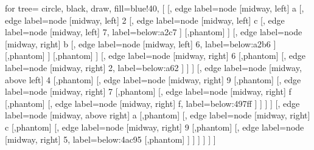\documentclass[10pt,a4paper,leqno,bibliography=totoc]{scrartcl}
\newenvironment{alphafootnotes}
{\par\edef\savedfootnotenumber{\number\value{footnote}}
\renewcommand{\thefootnote}{\alph{footnote}}
\setcounter{footnote}{0}}
{\par\setcounter{footnote}{\savedfootnotenumber}}
\begin{document}
\begin{alphafootnotes}
\begin{multicols*}{2}
		
		\begin{forest}
		for tree={
			circle,
			black,
			draw,
			fill=blue!40,
		}
		[{}
		[{}, edge label={node [midway, left] {a}}
		[{}, edge label={node [midway, left] {2}}
		[{}, edge label={node [midway, left] {c}}
		[{}, edge label={node [midway, left] {7}}, label=below:a2c7
		]
		[,phantom]
		]
		[{}, edge label={node [midway, right] {b}}
		[{}, edge label={node [midway, left] {6}}, label=below:a2b6
		]
		[,phantom]
		]
		[,phantom]
		]
		[{}, edge label={node [midway, right] {6}}
		[,phantom]
		[{}, edge label={node [midway, right] {2}},	label=below:a62
		]
		]
		]
		[{}, edge label={node [midway, above left] {4}}
		[,phantom]
		[{}, edge label={node [midway, right] {9}}
		[,phantom]
		[{}, edge label={node [midway, right] {7}}
		[,phantom]
		[{}, edge label={node [midway, right] {f}}
		[,phantom]
		[{}, edge label={node [midway, right] {f}}, label=below:497ff
		]
		]
		]
		]
		[{}, edge label={node [midway, above right] {a}}
		[,phantom]
		[{}, edge label={node [midway, right] {c}}
		[,phantom]
		[{}, edge label={node [midway, right] {9}}
		[,phantom]
		[{}, edge label={node [midway, right] {5}}, label=below:4ac95
		[,phantom]
		]
		]
		]
		]
		]
		]
		\end{forest}


\end{multicols*}
\end{alphafootnotes}
\end{document}
